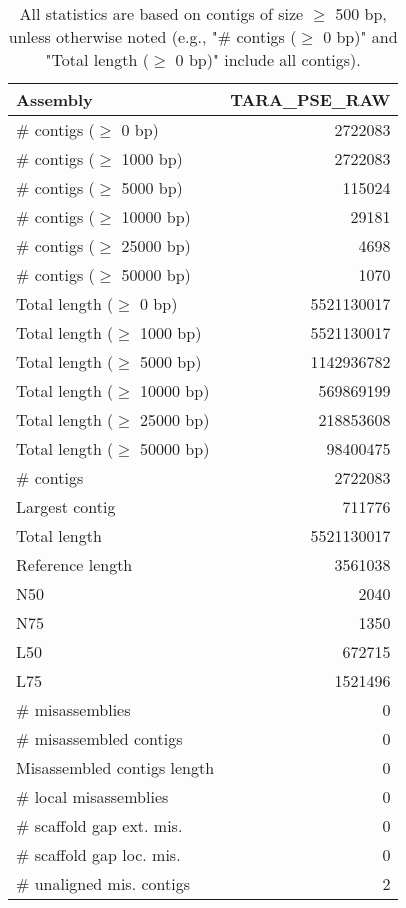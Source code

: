 \documentclass[12pt,a4paper]{article}
\begin{document}
\begin{table}[ht]
\begin{center}
\caption{All statistics are based on contigs of size $\geq$ 500 bp, unless otherwise noted (e.g., "\# contigs ($\geq$ 0 bp)" and "Total length ($\geq$ 0 bp)" include all contigs).}
\begin{tabular}{|l*{1}{|r}|}
\hline
Assembly & TARA\_PSE\_RAW \\ \hline
\# contigs ($\geq$ 0 bp) & 2722083 \\ \hline
\# contigs ($\geq$ 1000 bp) & 2722083 \\ \hline
\# contigs ($\geq$ 5000 bp) & 115024 \\ \hline
\# contigs ($\geq$ 10000 bp) & 29181 \\ \hline
\# contigs ($\geq$ 25000 bp) & 4698 \\ \hline
\# contigs ($\geq$ 50000 bp) & 1070 \\ \hline
Total length ($\geq$ 0 bp) & 5521130017 \\ \hline
Total length ($\geq$ 1000 bp) & 5521130017 \\ \hline
Total length ($\geq$ 5000 bp) & 1142936782 \\ \hline
Total length ($\geq$ 10000 bp) & 569869199 \\ \hline
Total length ($\geq$ 25000 bp) & 218853608 \\ \hline
Total length ($\geq$ 50000 bp) & 98400475 \\ \hline
\# contigs & 2722083 \\ \hline
Largest contig & 711776 \\ \hline
Total length & 5521130017 \\ \hline
Reference length & 3561038 \\ \hline
N50 & 2040 \\ \hline
N75 & 1350 \\ \hline
L50 & 672715 \\ \hline
L75 & 1521496 \\ \hline
\# misassemblies & 0 \\ \hline
\# misassembled contigs & 0 \\ \hline
Misassembled contigs length & 0 \\ \hline
\# local misassemblies & 0 \\ \hline
\# scaffold gap ext. mis. & 0 \\ \hline
\# scaffold gap loc. mis. & 0 \\ \hline
\# unaligned mis. contigs & 2 \\ \hline

\end{tabular}
\end{center}
\end{table}
\end{document}
